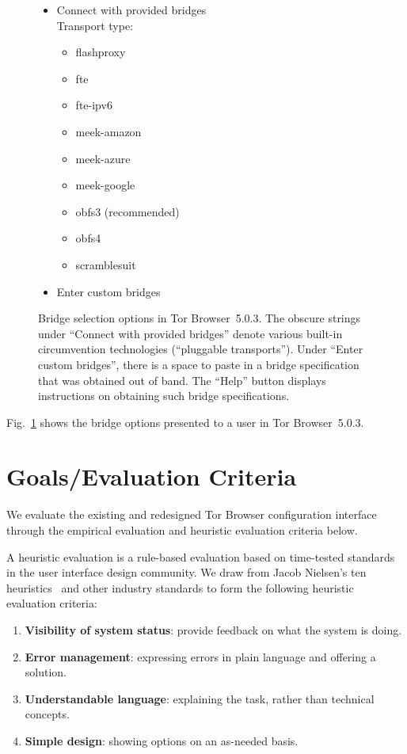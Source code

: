 \documentclass[USenglish,oneside,twocolumn]{article}
\begin{document}
\begin{figure}
\small
\begin{itemize}
\renewcommand{\labelitemi}{$\circ$}
\item Connect with provided bridges\\
Transport type:
\begin{itemize}
\item flashproxy
\item fte
\item fte-ipv6
\item meek-amazon
\item meek-azure
\item meek-google
\item obfs3 (recommended)
\item obfs4
\item scramblesuit
\end{itemize}
\item Enter custom bridges\qquad{}\\
\end{itemize}
\caption{
Bridge selection options in Tor Browser~5.0.3.
The obscure strings under ``Connect with provided bridges'' denote various
built-in circumvention technologies (``pluggable transports'').
Under ``Enter custom bridges'', there is a space to paste in
a bridge specification that was obtained out of band.
The ``Help'' button displays instructions on obtaining such
bridge specifications.
}
\label{fig:bridge-options}
\end{figure}

Fig.~\ref{fig:bridge-options} shows the bridge options
presented to a user in Tor Browser~5.0.3.

\section{Goals/Evaluation Criteria}
\label{sec:goals}
We evaluate the existing and redesigned Tor Browser configuration interface 
through the empirical evaluation and heuristic evaluation criteria below. 

A heuristic evaluation is a rule-based evaluation based on time-tested standards
in the user interface design community. We draw from Jacob Nielsen's ten heuristics~\cite{nielsen1994heuristic}
and other industry standards to form the following heuristic evaluation criteria: \\

\begin{enumerate}
    \item  {\bfseries Visibility of system status}: provide feedback on what the system is doing. 
    \item  {\bfseries Error management}: expressing errors in plain language and offering a solution. 
    \item  {\bfseries Understandable language}: explaining the task, rather than technical concepts. 
    \item  {\bfseries Simple design}: showing options on an as-needed basis. 
\end{enumerate}
\end{document}
